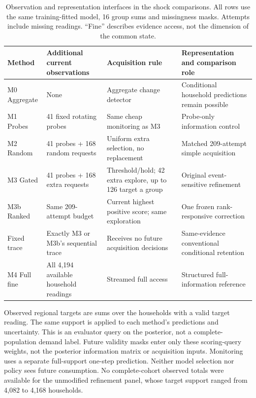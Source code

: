 \documentclass[conference]{IEEEtran}
\begin{document}
\begin{table}[!t]
\caption{Observation and representation interfaces in the shock comparisons. All rows use the same training-fitted model, 16 group sums and missingness masks. Attempts include missing readings. ``Fine'' describes evidence access, not the dimension of the common state.}
\label{tab:methods}\centering
\begin{tabular}{p{}p{}p{}p{}}
\toprule
Method & Additional current observations & Acquisition rule & Representation and comparison role\\
\midrule
M0 Aggregate & None & Aggregate change detector & Conditional household predictions remain possible\\
M1 Probes & 41 fixed rotating probes & Same cheap monitoring as M3 & Probe-only information control\\
M2 Random & 41 probes + 168 random requests & Uniform extra selection, no replacement & Matched 209-attempt simple acquisition\\
M3 Gated & 41 probes + 168 extra requests & Threshold/hold; 42 extra explore, up to 126 target a group & Original event-sensitive refinement\\
M3b Ranked & Same 209-attempt budget & Current highest positive score; same exploration & One frozen rank-responsive correction\\
Fixed trace & Exactly M3 or M3b's sequential trace & Receives no future acquisition decisions & Same-evidence conventional conditional retention\\
M4 Full fine & All 4,194 available household readings & Streamed full access & Structured full-information reference\\
\bottomrule
\end{tabular}
\end{table}

Observed regional targets are sums over the households with a valid target reading. The same support is applied to each method's predictions and uncertainty. This is an evaluator query on the posterior, not a complete-population demand label. Future validity masks enter only these scoring-query weights, not the posterior information matrix or acquisition inputs. Monitoring uses a separate full-support one-step prediction. Neither model selection nor policy sees future consumption. No complete-cohort observed totals were available for the unmodified refinement panel, whose target support ranged from 4,082 to 4,168 households.
\end{document}
